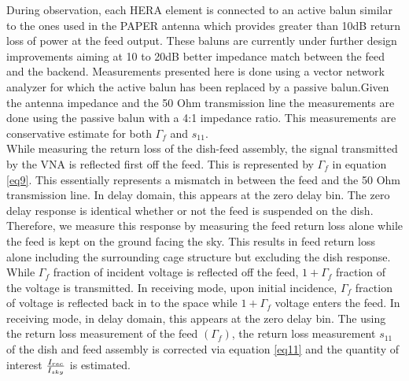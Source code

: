 \documentclass[twocolumn]{emulateapj}
\begin{document}
    
    During observation, each HERA element is connected to an active balun similar
    to the ones used in the PAPER antenna which provides greater than 10dB return
    loss of power at the feed output. These baluns are currently under further design 
    improvements aiming at 10 to 20dB
    better impedance match between the feed and the backend.
    Measurements presented here is done using a vector network analyzer for
    which the active balun has been replaced by a passive balun.Given the antenna
    impedance and the 50 Ohm transmission line the measurements are done using the
    passive balun with a 4:1 impedance ratio. This measurements are conservative
    estimate  for both $\Gamma_{f}$ and $s_{11}$.\\ While measuring the return loss
    of the dish-feed assembly, the signal transmitted by the VNA is reflected first
    off the feed. This is represented by $\Gamma_{f}$ in equation \ref{eq9}. This
    essentially represents a mismatch in between the feed and the 50 Ohm
    transmission line. In delay domain, this appears at the zero delay bin. The
    zero delay response is identical whether or not the feed is suspended on the
    dish. Therefore, we measure this response by measuring the feed return loss
    alone while the feed is kept on the ground facing the sky. This results in feed
    return loss alone including the surrounding cage structure but excluding the
    dish response. While $\Gamma_{f}$ fraction of incident voltage is reflected off
    the feed, $1+\Gamma_{f}$ fraction of the voltage is transmitted. In receiving
    mode, upon initial incidence, $\Gamma_{f}$ fraction of voltage is reflected
    back in to the space while $1+\Gamma_{f}$ voltage enters the feed. In receiving
    mode, in delay domain, this appears at the zero delay bin.  The using the
    return loss measurement of the feed $(\Gamma_{f})$, the return loss measurement
    $s_{11}$ of the dish and feed assembly is corrected via equation \ref{eq11} and
    the quantity of interest ${I_{rec}\over I_{sky}}$ is estimated. 
    
\end{document}
